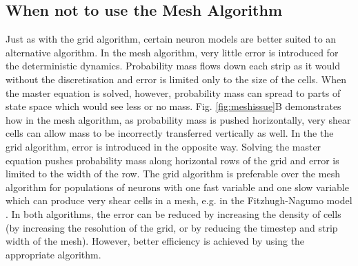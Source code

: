 \documentclass[utf8]{frontiersSCNS} %
\begin{document}
\subsection{When not to use the Mesh Algorithm} 
Just as with the grid algorithm, certain neuron models are better suited to an alternative algorithm. In the mesh algorithm, very little error is introduced for the deterministic dynamics. Probability mass flows down each strip as it would without the discretisation and error is limited only to the size of the cells. When the master equation is solved, however, probability mass can spread to parts of state space which would see less or no mass. Fig. \ref{fig:meshissue}B demonstrates how in the mesh algorithm, as probability mass is pushed horizontally, very shear cells can allow mass to be incorrectly transferred vertically as well. In the the grid algorithm, error is introduced in the opposite way. Solving the master equation pushes probability mass along horizontal rows of the grid and error is limited to the width of the row. The grid algorithm is preferable over the mesh algorithm for populations of neurons with one fast variable and one slow variable which can produce very shear cells in a mesh, e.g. in the Fitzhugh-Nagumo model \citep{de2019computational}. In both algorithms, the error can be reduced by increasing the density of cells (by increasing the resolution of the grid, or by reducing the timestep and strip width of the mesh). However, better efficiency is achieved by using the appropriate algorithm.
\end{document}
